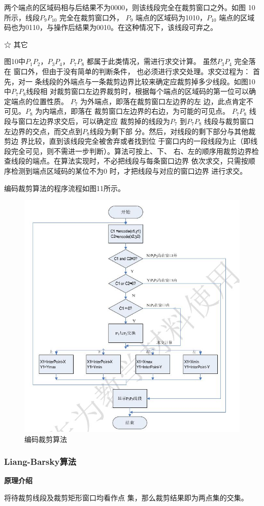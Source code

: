 \documentclass[a4paper,UTF8]{article}
\theoremstyle{definition}
\begin{document}
两个端点的区域码相与后结果不为0000，则该线段完全在裁剪窗口之外。如图
10 所示，线段$P_9P_{10}$ 完全在裁剪窗口外，
$P_9$ 端点的区域码为1010，$P_10$ 端点的区域
码也为0110，与操作后结果为0010。在这种情况下，该线段可弃之。

☆ 其它

图10中$P_1P_2，P_3P_4，P_7P_8$ 都属于此类情况，需进行求交计算。
虽然$P_3P_4$ 完全落在
窗口外，但由于没有简单的判断条件，
也必须进行求交处理。求交过程为：
首先，对一
条线段的外端点与一条裁剪边界比较来确定应裁剪掉多少线段。如图10 中$P_7P_8$线段相
对裁剪窗口左边界裁剪时，根据每个端点的区域码的第一位可以确定端点的位置性质。
$P_7$ 为外端点，即落在裁剪窗口左边界的左
边，此点肯定不可见。$P_8$ 为内端点，即落在
裁剪窗口左边界的右边，为可能的可见点。
$P_7P_8$ 线段与窗口左边界求交后，可以确定应
裁剪掉的线段为$P_7$ 到$P_7P_8$ 线段与裁剪窗口
左边界的交点，而交点到$P_8$线段为剩下部
分。然后，对线段的剩下部分与其他裁剪边
界比较，直到该线段完全被舍弃或者找到位
于窗口内的一段线段为止（即线段完全可见，则不需进一步判断）。算法可按上、下、
右、左的顺序用裁剪边界检查线段的端点。在算法实现时，不必把线段与每条窗口边界
依次求交，只需按顺序检测到端点区域码的某位不为0 时，才把线段与对应的窗口边界
进行求交。

编码裁剪算法的程序流程如图11所示。\cite{move}
\begin{figure}[h]

    \centering
    \includegraphics[width = .5\textwidth]{3-12.jpg}
    \caption{编码裁剪算法}
    \label{fig:label11}
\end{figure}
\subsubsection{Liang-Barsky算法}
\textbf{原理介绍}\par
将待裁剪线段及裁剪矩形窗口均看作点
集，那么裁剪结果即为两点集的交集。
\end{document}
